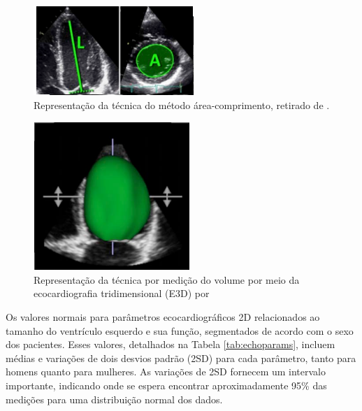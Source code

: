 \begin{figure}[H]
\centering
\includegraphics[width=0.3\linewidth]{capitulos/figuras/comprimento.png}
\caption{Representação da técnica do método área-comprimento, retirado de \textcite{Lang2015}.}
\label{fig:figcomprimento}
\end{figure}

\begin{figure}[H]
\centering
\includegraphics[width=0.3\linewidth]{capitulos/figuras/3d.png}
\caption{Representação da técnica por medição do volume por meio da ecocardiografia tridimensional (E3D) por \textcite{Lang2015}}
\label{fig:3d}
\end{figure}


 Os valores normais para parâmetros ecocardiográficos 2D relacionados ao tamanho do ventrículo esquerdo e sua função, segmentados de acordo com o sexo dos pacientes. Esses valores, detalhados na Tabela \ref{tab:echoparams}, incluem médias e variações de dois desvios padrão (2SD) para cada parâmetro, tanto para homens quanto para mulheres. As variações de 2SD fornecem um intervalo importante, indicando onde se espera encontrar aproximadamente 95\% das medições para uma distribuição normal dos dados.

